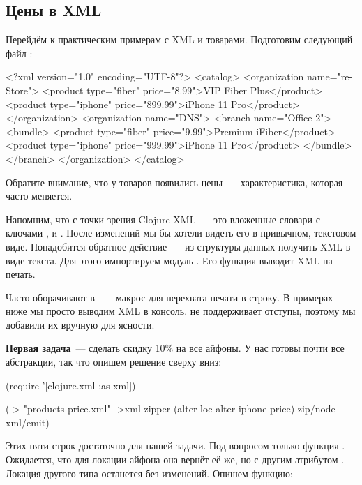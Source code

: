 \subsection{Цены в XML}

Перейдём к практическим примерам с XML и товарами. Подготовим следующий файл
:

\begin{english}
  \begin{xml}
<?xml version="1.0" encoding="UTF-8"?>
<catalog>
  <organization name="re-Store">
    <product type="fiber" price="8.99">VIP Fiber Plus</product>
    <product type="iphone" price="899.99">iPhone 11 Pro</product>
  </organization>
  <organization name="DNS">
    <branch name="Office 2">
      <bundle>
        <product type="fiber" price="9.99">Premium iFiber</product>
        <product type="iphone" price="999.99">iPhone 11 Pro</product>
      </bundle>
    </branch>
  </organization>
</catalog>
  \end{xml}
\end{english}

Обратите внимание, что у товаров появились цены~--- характеристика, которая часто
меняется.

Напомним, что с точки зрения Clojure XML~--- это вложенные словари с ключами
,  и . После изменений мы бы хотели видеть его в
привычном, текстовом виде. Понадобится обратное действие~--- из структуры данных
получить XML в виде текста. Для этого импортируем модуль . Его
функция  выводит XML на печать.

Часто  оборачивают в ~--- макрос для перехвата печати в
строку. В примерах ниже мы просто выводим XML в консоль.  не поддерживает
отступы, поэтому мы добавили их вручную для ясности.

\textbf{Первая задача}~--- сделать скидку 10\% на все айфоны. У нас готовы почти все
абстракции, так что опишем решение сверху вниз:

\begin{english}
  \begin{clojure}
(require '[clojure.xml :as xml])

(-> "products-price.xml"
    ->xml-zipper
    (alter-loc alter-iphone-price)
    zip/node
    xml/emit)
  \end{clojure}
\end{english}

Этих пяти строк достаточно для нашей задачи. Под вопросом только функция
. Ожидается, что для локации-айфона она вернёт её же, но с
другим атрибутом . Локация другого типа останется без изменений. Опишем
функцию:

